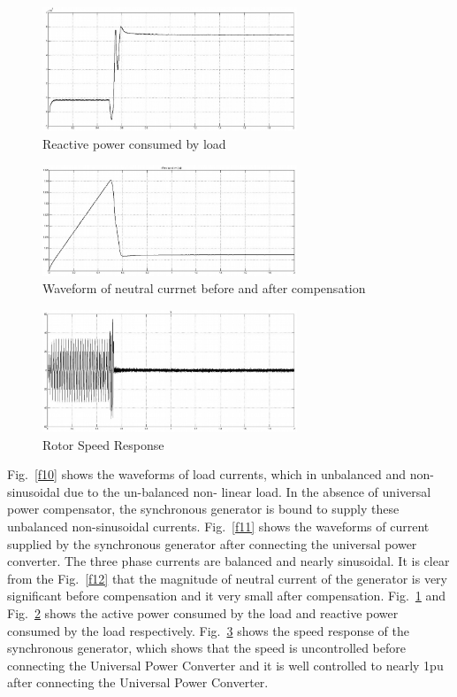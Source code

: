 \documentclass[journal,twoside]{IEEEtran}
\begin{document}
\begin{figure}[!ht]
\centering
\includegraphics[width=3in]{13}
\caption{Reactive power consumed by load}
\label{f13}
\end{figure}

\begin{figure}[!ht]
\centering
\includegraphics[width=3in]{14}
\caption{Waveform of neutral currnet before and after compensation}
\label{f14}
\end{figure}

\begin{figure}[!ht]
\centering
\includegraphics[width=3in]{15}
\caption{Rotor Speed Response}
\label{f15}
\end{figure}


\bigskip

Fig.~\ref{f10} shows the waveforms of load currents, which in unbalanced and non-sinusoidal due to the un-balanced non-
linear load. In the absence of universal power compensator,
the synchronous generator is bound to supply these unbalanced non-sinusoidal currents. Fig.~\ref{f11} shows the
waveforms of current supplied by the synchronous generator
after connecting the universal power converter. The three
phase currents are balanced and nearly sinusoidal. It is clear from the Fig.~\ref{f12} that the magnitude of neutral current
of the generator is very significant before compensation and
it very small after compensation. Fig.~\ref{f13} and Fig.~\ref{f14} shows
the active power consumed by the load and reactive power
consumed by the load respectively. Fig.~\ref{f15} shows the speed
response of the synchronous generator, which shows that the
speed is uncontrolled before connecting the Universal Power
Converter and it is well controlled to nearly 1pu after
connecting the Universal Power Converter.
\end{document}
